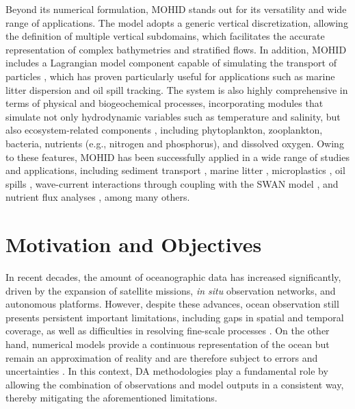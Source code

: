 Beyond its numerical formulation, MOHID stands out for its versatility and wide range of applications. The model adopts a generic vertical discretization, allowing the definition of multiple vertical subdomains, which facilitates the accurate representation of complex bathymetries and stratified flows. In addition, MOHID includes a Lagrangian model component capable of simulating the transport of particles \parencite{braunschweig2004object}, which has proven particularly useful for applications such as marine litter dispersion and oil spill tracking. The system is also highly comprehensive in terms of physical and biogeochemical processes, incorporating modules that simulate not only hydrodynamic variables such as temperature and salinity, but also ecosystem-related components \parencite{neves2007numerical}, including phytoplankton, zooplankton, bacteria, nutrients (e.g., nitrogen and phosphorus), and dissolved oxygen. Owing to these features, MOHID has been successfully applied in a wide range of studies and applications, including sediment transport \parencite{monreal2025sediment}, marine litter \parencite{rosas2021marine}, microplastics \parencite{cloux2024regional}, oil spills \parencite{mittal2024oil}, wave-current interactions through coupling with the SWAN model \parencite{mills2025evaluating}, and nutrient flux analyses \parencite{pablo2022climatology}, among many others.

\section{Motivation and Objectives}
In recent decades, the amount of oceanographic data has increased significantly, driven by the expansion of satellite missions, \emph{in situ} observation networks, and autonomous platforms. However, despite these advances, ocean observation still presents persistent important limitations, including gaps in spatial and temporal coverage, as well as difficulties in resolving fine-scale processes \parencite{tzachor2023}. On the other hand, numerical models provide a continuous representation of the ocean but remain an approximation of reality and are therefore subject to errors and uncertainties \parencite{evensen2022data}. In this context, DA methodologies play a fundamental role by allowing the combination of observations and model outputs in a consistent way, thereby mitigating the aforementioned limitations.

